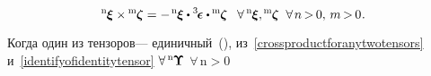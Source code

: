 \begin{otherlanguage}{russian}
\nopagebreak\vspace{-0.2em}\begin{equation}\label{crossproductforanytwotensors}
{^\mathrm{n}\hspace{-0.12ex}\bm{\xi}} \times \hspace{-0.12ex} {^\mathrm{m}\hspace{-0.12ex}\bm{\zeta}}
=
- \hspace{.25ex} {^\mathrm{n}\hspace{-0.12ex}\bm{\xi}} \dotp \levicivitatensor \dotp \hspace{-0.1ex} {^\mathrm{m}\hspace{-0.12ex}\bm{\zeta}}
\;\;\:
%
\forall \hspace{.4ex} {^\mathrm{n}\hspace{-0.12ex}\bm{\xi}} ,
\hspace{-0.12ex} {^\mathrm{m}\hspace{-0.12ex}\bm{\zeta}}
\;\;
\forall \hspace{.25ex} n \hspace{-0.25ex} > \hspace{-0.25ex} 0 , \,
m \hspace{-0.25ex} > \hspace{-0.25ex} 0
\hspace{.1ex} .
\end{equation}

\vspace{-0.1em} \noindent Когда один из тензоров\:--- единичный~(), из~\eqref{crossproductforanytwotensors} и~\eqref{identifyofidentitytensor} ${\forall \, {^\mathrm{n}\hspace{-0.12ex}\bm{\Upsilon}}}$ ${\forall \,\mathrm{n \!>\! 0}}$


\end{otherlanguage}
